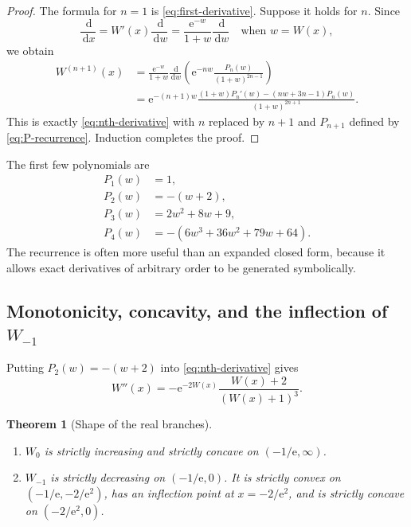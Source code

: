 \documentclass[11pt]{article}
\numberwithin{equation}{section}
\newtheorem{theorem}{Theorem}[section]
\theoremstyle{definition}
\theoremstyle{remark}
\newcommand{\e}{\mathrm e}
\newcommand{\dd}{\,\mathrm d}
\begin{document}
\begin{proof}
The formula for $n=1$ is \eqref{eq:first-derivative}.  Suppose it holds for
$n$.  Since
\[
  \frac{\dd}{\dd x}=W'(x)\frac{\dd}{\dd w}
  =\frac{\e^{-w}}{1+w}\frac{\dd}{\dd w}
  \quad\text{when }w=W(x),
\]
we obtain
\begin{align*}
W^{(n+1)}(x)
 &=\frac{\e^{-w}}{1+w}\frac{\dd}{\dd w}
   \left(\e^{-nw}\frac{P_n(w)}{(1+w)^{2n-1}}\right)\\
 &=\e^{-(n+1)w}\frac{(1+w)P_n'(w)-(nw+3n-1)P_n(w)}
                    {(1+w)^{2n+1}}.
\end{align*}
This is exactly \eqref{eq:nth-derivative} with $n$ replaced by $n+1$ and
$P_{n+1}$ defined by \eqref{eq:P-recurrence}.  Induction completes the proof.
\end{proof}

The first few polynomials are
\begin{align*}
 P_1(w)&=1,\\
 P_2(w)&=-(w+2),\\
 P_3(w)&=2w^2+8w+9,\\
 P_4(w)&=-(6w^3+36w^2+79w+64).
\end{align*}
The recurrence is often more useful than an expanded closed form, because it
allows exact derivatives of arbitrary order to be generated symbolically.

\subsection{Monotonicity, concavity, and the inflection of \texorpdfstring{$W_{-1}$}{W-1}}

Putting $P_2(w)=-(w+2)$ into \eqref{eq:nth-derivative} gives
\begin{equation}
  W''(x)=-\e^{-2W(x)}\frac{W(x)+2}{(W(x)+1)^3}.        \label{eq:second-derivative}
\end{equation}

\begin{theorem}[Shape of the real branches]
\label{thm:shape}
\begin{enumerate}[label=\textup{(\roman*)}]
\item $W_0$ is strictly increasing and strictly concave on
      $(-1/\e,\infty)$.
\item $W_{-1}$ is strictly decreasing on $(-1/\e,0)$.
      It is strictly convex on $(-1/\e,-2/\e^2)$, has an inflection point at
      $x=-2/\e^2$, and is strictly concave on $(-2/\e^2,0)$.
\end{enumerate}
\end{theorem}
\end{document}
